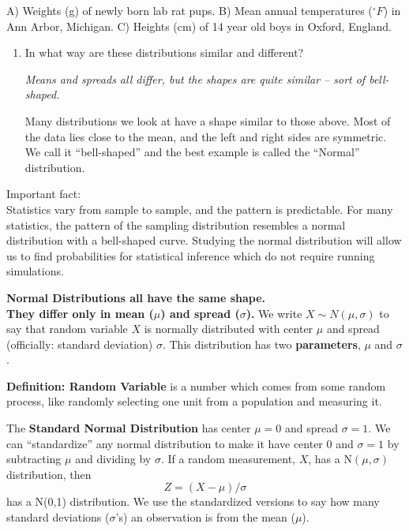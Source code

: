 A) Weights (g) of newly born lab rat pups. 
B) Mean annual temperatures ($^\circ F$) in Ann Arbor, Michigan.
C) Heights (cm) of 14 year old boys in Oxford, England. \vspace{-.1in}


\begin{enumerate}
  \item  In what way are these distributions similar and different?
\begin{students}
        \vspace{3cm}        
\end{students}

\begin{key}
{\it Means and spreads all differ, but the shapes are quite
  similar -- sort of bell-shaped. }
\end{key}

  Many distributions we look at have a shape similar to those above.
  Most of the data lies close to the mean, and the left and right
  sides are symmetric.  We call it ``bell-shaped'' and the best example is
  called the ``Normal'' distribution.
\end{enumerate}

Important fact:\\
{\sf Statistics vary from sample to sample, and the pattern is
  predictable.  For many statistics, the pattern of the sampling
  distribution resembles a normal distribution with a bell-shaped
  curve. }  Studying the normal distribution will allow us to find
probabilities for statistical inference which do not require running
simulations.

 {\bf Normal Distributions all have the same shape.\\
They differ only in mean ($\mu$) and spread ($\sigma$).}  We write $X
\sim N(\mu, \sigma)$ to say that random variable $X$ is normally
distributed with center $\mu$ and spread (officially: standard
deviation) $\sigma$.  This distribution
has two {\bf parameters}, $\mu$ and $\sigma$. 

{\bf Definition:  Random Variable} is a number which comes from some
random process, like randomly selecting one unit from a population and
measuring it.

The  {\bf Standard Normal Distribution} has center $\mu=0$ and spread
$\sigma = 1$.  We can ``standardize'' any normal distribution to make
it have center 0 and $\sigma = 1$ by subtracting $\mu$ and dividing by
$\sigma$. If a random measurement, $X$, has a N$(\mu, \sigma)$
distribution, then $$Z = (X - \mu)/\sigma$$ has a N(0,1) distribution. 
We use the standardized versions to say how many standard deviations
($\sigma$'s) an observation is from the mean ($\mu$). 


